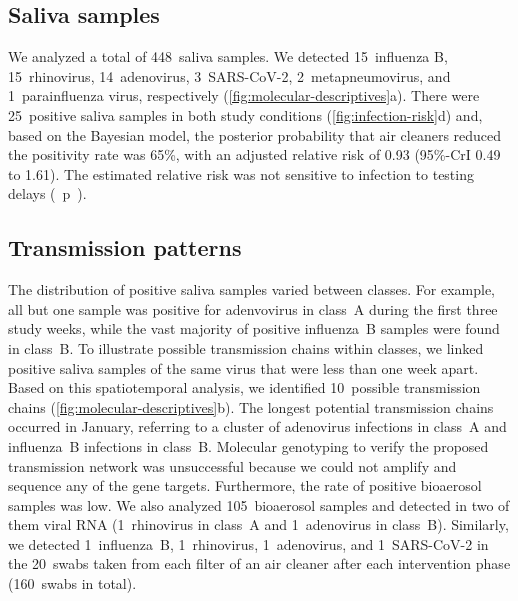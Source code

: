 \documentclass[fleqn,11pt]{wlscirep}
\begin{document}
\subsection*{Saliva samples}

We analyzed a total of 448~saliva samples. We detected 15~influenza B, 15~rhinovirus, 14~adenovirus, 3~SARS-CoV-2, 2~metapneumovirus, and 1~parainfluenza virus, respectively (\cref{fig:molecular-descriptives}a). There were 25~positive saliva samples in both study conditions (\cref{fig:infection-risk}d) and, based on the Bayesian model, the posterior probability that air cleaners reduced the positivity rate was 65\%, with an adjusted relative risk of 0.93 (95\%-CrI 0.49 to 1.61). The estimated relative risk was not sensitive to infection to testing delays (\supp~p~). 

\subsection*{Transmission patterns}

The distribution of positive saliva samples varied between classes. For example, all but one sample was positive for adenvovirus in class~A during the first three study weeks, while the vast majority of positive influenza~B samples were found in class~B. To illustrate possible transmission chains within classes, we linked positive saliva samples of the same virus that were less than one week apart. Based on this spatiotemporal analysis, we identified 10~possible transmission chains (\cref{fig:molecular-descriptives}b). The longest potential transmission chains occurred in January, referring to a cluster of adenovirus infections in class~A and influenza~B infections in class~B. Molecular genotyping to verify the proposed transmission network was unsuccessful because we could not amplify and sequence any of the gene targets. Furthermore, the rate of positive bioaerosol samples was low. We also analyzed 105~bioaerosol samples and detected in two of them viral RNA (1~rhinovirus in class~A and 1~adenovirus in class~B). Similarly, we detected 1~influenza~B, 1~rhinovirus, 1~adenovirus, and 1~SARS-CoV-2 in the 20~swabs taken from each filter of an air cleaner after each intervention phase (160~swabs in total). 

\end{document}
